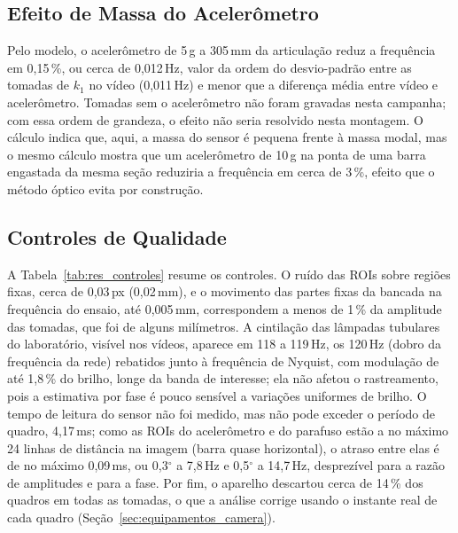 \documentclass[a4paper,10pt,twocolumn]{article}
\begin{document}
\subsection{Efeito de Massa do Acelerômetro}
\label{sec:res_massa}

Pelo modelo, o acelerômetro de 5\,g a 305\,mm da articulação reduz a frequência em 0,15\,\%, ou cerca de 0,012\,Hz, valor da ordem do desvio-padrão entre as tomadas de $k_1$ no vídeo (0,011\,Hz) e menor que a diferença média entre vídeo e acelerômetro. Tomadas sem o acelerômetro não foram gravadas nesta campanha; com essa ordem de grandeza, o efeito não seria resolvido nesta montagem. O cálculo indica que, aqui, a massa do sensor é pequena frente à massa modal, mas o mesmo cálculo mostra que um acelerômetro de 10\,g na ponta de uma barra engastada da mesma seção reduziria a frequência em cerca de 3\,\%, efeito que o método óptico evita por construção.

\subsection{Controles de Qualidade}
\label{sec:res_controles}

A Tabela~\ref{tab:res_controles} resume os controles. O ruído das ROIs sobre regiões fixas, cerca de 0,03\,px (0,02\,mm), e o movimento das partes fixas da bancada na frequência do ensaio, até 0,005\,mm, correspondem a menos de 1\,\% da amplitude das tomadas, que foi de alguns milímetros. A cintilação das lâmpadas tubulares do laboratório, visível nos vídeos, aparece em 118 a 119\,Hz, os 120\,Hz (dobro da frequência da rede) rebatidos junto à frequência de Nyquist, com modulação de até 1,8\,\% do brilho, longe da banda de interesse; ela não afetou o rastreamento, pois a estimativa por fase é pouco sensível a variações uniformes de brilho. O tempo de leitura do sensor não foi medido, mas não pode exceder o período de quadro, 4,17\,ms; como as ROIs do acelerômetro e do parafuso estão a no máximo 24 linhas de distância na imagem (barra quase horizontal), o atraso entre elas é de no máximo 0,09\,ms, ou 0,3$^\circ$ a 7,8\,Hz e 0,5$^\circ$ a 14,7\,Hz, desprezível para a razão de amplitudes e para a fase. Por fim, o aparelho descartou cerca de 14\,\% dos quadros em todas as tomadas, o que a análise corrige usando o instante real de cada quadro (Seção~\ref{sec:equipamentos_camera}).
\end{document}
